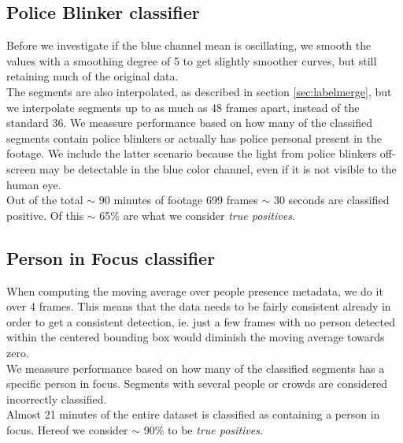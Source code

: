 \subsection{Police Blinker classifier}
%
Before we investigate if the blue channel mean is oscillating, we smooth the values with a smoothing degree of 5 to get slightly smoother curves, but still retaining much of the original data.\\
The segments are also interpolated, as described in section \ref{sec:labelmerge}, but we interpolate segments up to as much as 48 frames apart, instead of the standard 36.
%
We meassure performance based on how many of the classified segments contain police blinkers or actually has police personal present in the footage. We include the latter scenario because the light from police blinkers off-screen may be detectable in the blue color channel, even if it is not visible to the human eye.\\
Out of the total $\sim$ 90 minutes of footage 699 frames $\sim$ 30 seconds are classified positive. Of this $\sim$ 65\% are what we consider \textit{true positives}. %
%
\subsection{Person in Focus classifier}
%
When computing the moving average over people presence metadata, we do it over 4 frames. This means that the data needs to be fairly consistent already in order to get a consistent detection, ie. just a few frames with no person detected within the centered bounding box would diminish the moving average towards zero.\\
%
We meassure performance based on how many of the classified segments has a specific person in focus. Segments with several people or crowds are considered incorrectly classified.\\
Almost 21 minutes of the entire dataset is classified as containing a person in focus. Hereof we consider $\sim$ 90\% to be \textit{true positives}.
%
%
